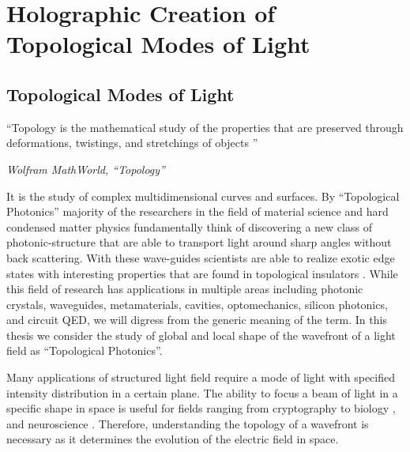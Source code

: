 \chapter{Holographic Creation of Topological Modes of Light}
\label{ch:topological_modes}

\section{Topological Modes of Light}

\setlength{\epigraphwidth}{0.8\textwidth}
\epigraph{``Topology is the mathematical study of the properties that are preserved through deformations, twistings, and stretchings of objects \cite{topology}''}{\textit{Wolfram MathWorld, ``Topology''}}

It is the study of complex multidimensional curves and surfaces. By ``Topological Photonics'' \cite{leykam2016, Zhou_2017} majority of the researchers in the field of material science and hard condensed matter physics fundamentally think of discovering a new class of photonic-structure \cite{Barik666} that are able to transport light around sharp angles without back scattering. With these wave-guides scientists are able to realize exotic edge states with interesting properties that are found  in topological insulators \cite{hsieh2008, haldane20107}. While this field of research has applications in multiple areas \cite{ozawa2019} including photonic crystals, waveguides, metamaterials, cavities, optomechanics, silicon photonics, and circuit QED, we will digress from the generic meaning of the term. In this thesis we consider the study of global and local shape of the wavefront of a light field as ``Topological Photonics''. 

Many applications of structured light field require a mode of light with specified intensity distribution in a certain plane. The ability to focus a beam of light in a specific shape in space is useful for fields ranging from cryptography \cite{Horstmeyer2013, Horstmeyer2013cleo} to biology \cite{wang2012, Papadopoulos:12}, and neuroscience \cite{Finisguerra2019, VAZIRI2012128, Deisseroth2005,Black13}. Therefore, understanding the topology of a wavefront is necessary as it determines the evolution of the electric field in space. 


